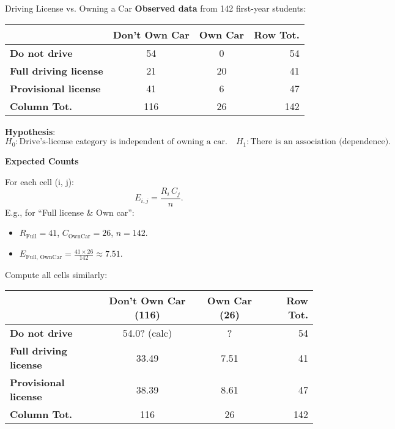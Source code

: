 \documentclass[10pt]{extarticle}
\begin{document}
\begin{examplebox}{Driving License vs. Owning a Car}{}
    \small
    \textbf{Observed data} from 142 first-year students:

    \begin{center}
        \begin{tabular}{lccr}
            \toprule
                                          & Don't Own Car & Own Car & Row Tot. \\
            \midrule
            \textbf{Do not drive}         & 54            & 0       & 54       \\
            \textbf{Full driving license} & 21            & 20      & 41       \\
            \textbf{Provisional license}  & 41            & 6       & 47       \\
            \midrule
            \textbf{Column Tot.}          & 116           & 26      & 142      \\
            \bottomrule
        \end{tabular}
    \end{center}

    \textbf{Hypothesis}:
    \[
        H_0:
        \text{Drive's-license category is independent of owning a car.}
        \quad
        H_1:
        \text{There is an association (dependence).}
    \]

    \textbf{Expected Counts}

    For each cell (i, j):
    \[
        E_{i,j}
        = \frac{R_i \, C_j}{n}.
    \]
    E.g., for “Full license \& Own car”:
    \begin{itemize}
        \item $R_{\text{Full}} = 41$, $C_{\text{OwnCar}} = 26$, $n=142$.
        \item $E_{\text{Full, OwnCar}} = \frac{41\times 26}{142}\approx 7.51.$
    \end{itemize}

    Compute all cells similarly:

    \begin{center}
        \begin{tabular}{lccr}
            \toprule
                                          & Don't Own Car (116) & Own Car (26) & Row Tot. \\
            \midrule
            \textbf{Do not drive}         & 54.0? (calc)        & ?            & 54       \\
            \textbf{Full driving license} & 33.49               & 7.51         & 41       \\
            \textbf{Provisional license}  & 38.39               & 8.61         & 47       \\
            \midrule
            \textbf{Column Tot.}          & 116                 & 26           & 142      \\
            \bottomrule
        \end{tabular}
    \end{center}


\end{examplebox}
\end{document}
